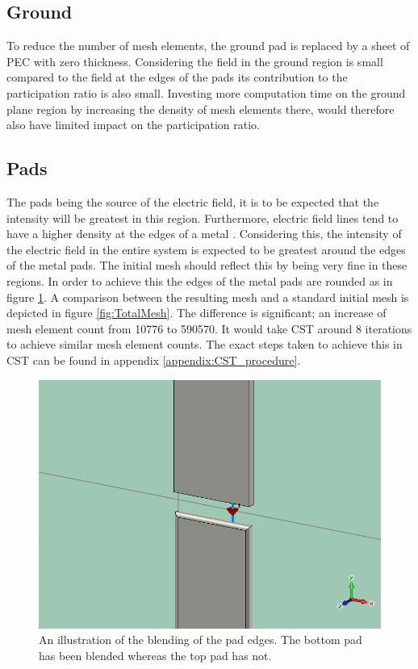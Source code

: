 \subsection{Ground}
To reduce the number of mesh elements, the ground pad is replaced by a sheet of PEC with zero thickness. Considering the field in the ground region is small compared to the field at the edges of the pads its contribution to the participation ratio is also small. Investing more computation time on the ground plane region by increasing the density of mesh elements there, would therefore also have limited impact on the participation ratio.
\subsection{Pads}
The pads being the source of the electric field, it is to be expected that the intensity will be greatest in this region. Furthermore, electric field lines tend to have a higher density at the edges of a metal . Considering this, the intensity of the electric field in the entire system is expected to be greatest around the edges of the metal pads. The initial mesh should reflect this by being very fine in these regions. In order to achieve this the edges of the metal pads are rounded as in figure \ref{fig:blending4}. A comparison between the resulting mesh and a standard initial mesh is depicted in figure \ref{fig:TotalMesh}. The difference is significant; an increase of mesh element count from 10776 to 590570. It would take CST around 8 iterations to achieve similar mesh element counts. The exact steps taken to achieve this in CST can be found in appendix \ref{appendix:CST_procedure}. 

\begin{figure}
	\centering
	\includegraphics[scale=.5]{Figures/blending4}
	\caption{An illustration of the blending of the pad edges. The bottom pad has been blended whereas the top pad has not.}
	\label{fig:blending4}
\end{figure}

